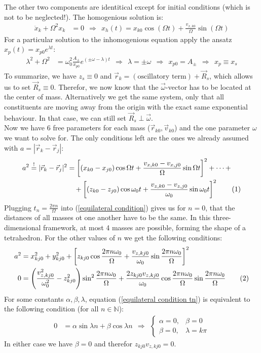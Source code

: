\documentclass[a4paper,12pt]{article}
\newcommand\numberthis{\addtocounter{equation}{1}\tag{\theequation}}
\newcommand{\kla}{}
\newcommand{\klam}{}
\newcommand{\tecxt}{}
\begin{document}
The other two components are identitical except for initial conditions (which is not to be neglected!). The homogenious solution is:
\begin{align*}
\ddot{x}_k+\Omega^2x_k&=0\ \ \Rightarrow\ \ x_h(t)=x_{k0}\cos(\Omega t)+\frac{v_{x,k0}}{\Omega}\sin(\Omega t)
\end{align*}
For a particular solution to the inhomogenious equation apply the ansatz $x_p(t)=x_{p0}e^{\lambda t}$:
\begin{align*}
\lambda^2+\Omega^2&=\omega_0^2\frac{A_\pm}{x_{p0}} e^{(\pm\omega-\lambda) t}\ \ \Rightarrow\ \ \lambda=\pm\omega\ \ \Rightarrow\ \ x_{p0}= A_\pm\ \ \Rightarrow\ \ x_p\equiv x_s
\end{align*}
To summarize, we have $z_s\equiv 0$ and $\vec{r}_k=(\tecxt\text{oscillatory term})+\vec{R}_s$, which allows us to set $\vec{R}_s\equiv 0$. Therefor, we now know that the $\vec{\omega}$-vector has to be located at the center of mass. Alternatively we get the same system, only that all constituents are moving away from the origin with the exact same exponential behaviour. In that case, we can still set $\vec{R}_s\perp\vec{\omega}$.\\
Now we have 6 free parameters for each mass ($\vec{r}_{k0}, \vec{v}_{k0}$) and the one parameter $\omega$ we want to solve for. The only conditions left are the ones we already assumed with $a=|\vec{r}_k-\vec{r}_j|$:
\begin{align*}
a^2\overset{!}{=}|\vec{r}_k-\vec{r}_j|^2&=\klam\left[ {(x_{k0}-x_{j0})\cos\Omega t+\frac{v_{x,k0}-v_{x,j0}}{\Omega}\sin\Omega t} \right]^2+\dots +\\
&\ \ \ +\klam\left[ {(z_{k0}-z_{j0})\cos\omega_0 t+\frac{v_{z,k0}-v_{z,j0}}{\omega_0}\sin\omega_0 t} \right]^2\numberthis\label{equilateral condition}
\end{align*}
Plugging $t_n=\frac{2\pi n}{\Omega}$ into (\ref{equilateral condition}) gives us for $n=0$, that the distances of all masses ot one another have to be the same. In this three-dimensional framework, at most 4 masses are possible, forming the shape of a tetrahedron. For the other values of $n$ we get the following conditions:
\begin{align*}
a^2&=x_{kj0}^2+y_{kj0}^2+\klam\left[ {z_{kj0}\cos\frac{2\pi n\omega_0}{\Omega}+\frac{v_{z,kj0}}{\omega_0}\sin\frac{2\pi n\omega_0}{\Omega}} \right]^2\\
0&=\kla\left( {\frac{v_{z,kj0}^2}{\omega_0^2}-z_{kj0}^2} \right)\sin^2\frac{2\pi n\omega_0}{\Omega}+\frac{2z_{kj0}v_{z,kj0}}{\omega_0}\cos\frac{2\pi n\omega_0}{\Omega}\sin\frac{2\pi n\omega_0}{\Omega}\numberthis\label{equilateral condition tn}
\end{align*}
For some constants $\alpha,\beta,\lambda$, equation (\ref{equilateral condition tn}) is equivalent to the following condition (for all $n\in\mathbb{N}$):
\begin{align*}
0&=\alpha\sin\lambda n+\beta\cos\lambda n\ \ \Rightarrow\ \ \left\{\begin{matrix}
\alpha=0,&\beta=0\\ \beta=0,&\lambda=k\pi
\end{matrix}\right.
\end{align*}
In either case we have $\beta=0$ and therefor $z_{kj0}v_{z,kj0}=0$.
\end{document}
